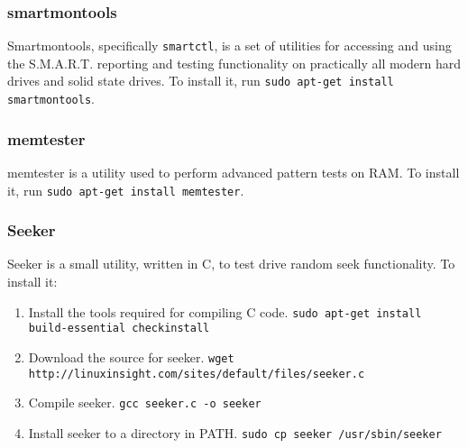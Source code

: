 \documentclass{article}
\def\code#1{\texttt{#1}}
\begin{document}
\begin{flushleft}
\subsubsection{smartmontools}
Smartmontools, specifically \code{smartctl}, is a set of utilities for accessing and using the S.M.A.R.T. reporting and testing functionality on practically all modern hard drives and solid state drives.  To install it, run \code{sudo apt-get install smartmontools}.
\subsubsection{memtester}
memtester is a utility used to perform advanced pattern tests on RAM.  To install it, run \code{sudo apt-get install memtester}.
\subsubsection{Seeker}
Seeker is a small utility, written in C, to test drive random seek functionality.  To install it:
\begin{enumerate}
  \item Install the tools required for compiling C code.\linebreak\linebreak
  \code{sudo apt-get install build-essential checkinstall}
  \item Download the source for seeker.\linebreak\linebreak
  \code{wget http://linuxinsight.com/sites/default/files/seeker.c}
  \item Compile seeker.\linebreak\linebreak
  \code{gcc seeker.c -o seeker}
  \item Install seeker to a directory in PATH.\linebreak\linebreak
  \code{sudo cp seeker /usr/sbin/seeker}
\end{enumerate}
\end{flushleft}
\end{document}
